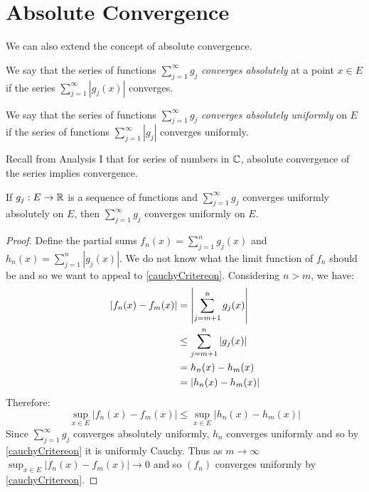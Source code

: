 \documentclass[../main.tex]{subfiles}
\begin{document}
\section{Absolute Convergence}
We can also extend the concept of absolute convergence.
\begin{definition}
  We say that the series of functions $\sum_{j = 1}^{\infty} g_j$ \textit{converges absolutely} at a point $x \in E$ if the series $\sum_{j = 1}^{\infty} |g_j(x)|$ converges.
\end{definition}
\begin{definition}
  We say that the series of functions $\sum_{j = 1}^{\infty} g_j$ \textit{converges absolutely uniformly} on $E$ if the series of functions $\sum_{j = 1}^{\infty} |g_j|$ converges uniformly.
\end{definition}
\begin{remark}[Recap]
  Recall from Analysis I that for series of numbers in $\mathbb{C}$, absolute convergence of the series implies convergence.
\end{remark}
\begin{proposition}
  If $g_j: E \to \mathbb{R}$ is a sequence of functions and $\sum_{j = 1}^{\infty} g_j$ converges uniformly absolutely on $E$, then $\sum_{j = 1}^{\infty} g_j$ converges uniformly on $E$.
\end{proposition}
\begin{proof}
  Define the partial sums $f_n(x) = \sum_{j = 1}^{n} g_j(x)$ and $h_n(x) = \sum_{j = 1}^{n} |g_j(x)|$.
  We do not know what the limit function of $f_n$ should be and so we want to appeal to \cref{cauchyCritereon}.
  Considering $n > m$, we have:
  \begin{align*}
    |f_n(x) - f_m(x)| &= \left\lvert \sum_{j = m + 1}^{n} g_j(x) \right\rvert \\
                      &\leq \sum_{j = m + 1}^{n} |g_j(x)| \\
                      &= h_n(x) - h_m(x) \\
                      &= |h_n(x) - h_m(x)|
  \end{align*}
  Therefore:
  \[
    \sup_{x \in E} |f_n(x) - f_m(x)| \leq \sup_{x \in E} |h_n(x) - h_m(x)|
  \]
  Since $\sum_{j = 1}^{\infty} g_j$ converges absolutely uniformly, $h_n$ converges uniformly and so by \cref{cauchyCritereon} it is uniformly Cauchy.
  Thus as $m \to \infty$ $\sup_{x \in E} |f_n(x) - f_m(x)| \to 0$ and so $(f_n)$ converges uniformly by \cref{cauchyCritereon}.
\end{proof}
\end{document}
